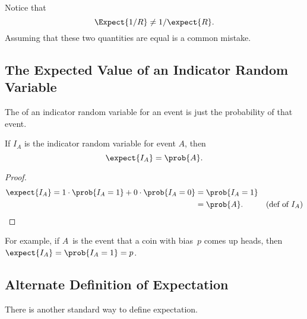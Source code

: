 Notice that
\[
\Expect{1/R} \neq 1/\expect{R}.
\]
 Assuming that these two quantities are equal is a common mistake.

\subsection{The Expected Value of an Indicator Random Variable}

The  of an  indicator random
variable for an event is just the probability of that event.

\begin{lemma}\label{expindic}
If $I_A$ is the indicator random variable for event $A$, then
\[
\expect{I_A} = \prob{A}.
\]
\end{lemma}

\begin{proof}
\begin{align*}
\expect{I_A} =  1 \cdot \prob{I_A = 1} + 0 \cdot \prob{I_A = 0}
     & = \prob{I_A = 1} \\
     & =  \prob{A}.\qedhere & \text{(def of $I_A$)}
\end{align*}
\end{proof}
For example, if $A$~is the event that a coin with bias~$p$ comes up
heads, then $\expect{I_A} = \prob{I_A=1} = p$.


\subsection{Alternate Definition of Expectation}

There is another standard way to define expectation.

